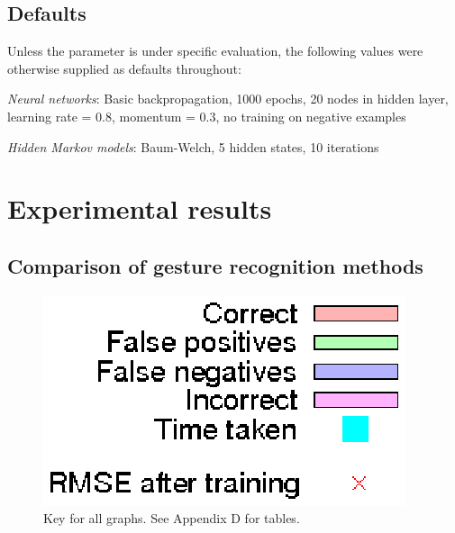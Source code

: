 \documentclass[12pt,a4,notitlepage]{report}
\renewcommand{\_}{\texttt{\symbol{95}}}
\newcommand{\<}{\texttt{\symbol{60}}}
\renewcommand{\>}{\texttt{\symbol{62}}}
\begin{document}
\subsection{Defaults}

Unless the parameter is under specific evaluation, the following values were otherwise supplied as defaults throughout:

\textit{Neural networks}: Basic backpropagation, 1000 epochs, 20 nodes in hidden layer, learning rate = 0.8, momentum = 0.3, no training on negative examples

\textit{Hidden Markov models}: Baum-Welch, 5 hidden states, 10 iterations

\section{Experimental results}

\subsection{Comparison of gesture recognition methods}

\begin{figure}
\centering
\includegraphics[scale=0.7,angle=0]{results/key.ps}
\caption{Key for all graphs. See Appendix D for tables.}
\label{key}
\end{figure}
\end{document}
